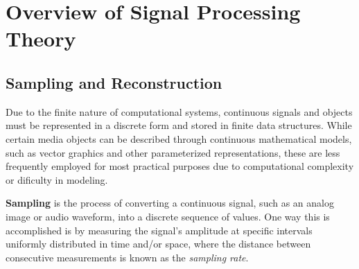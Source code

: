 






\section{Overview of Signal Processing Theory}

\subsection{Sampling and Reconstruction}

Due to the finite nature of computational systems, continuous signals and objects must be represented in a discrete form and stored in finite data structures. While certain media objects can be described through continuous mathematical models, such as vector graphics and other parameterized representations, these are less frequently employed for most practical purposes due to computational complexity or dificulty in modeling.

\textbf{Sampling} is the process of converting a continuous signal, such as an analog image or audio waveform, into a discrete sequence of values. One way this is accomplished is by measuring the signal's amplitude at specific intervals uniformly distributed in time and/or space, where the distance between consecutive measurements is known as the \textit{sampling rate}.

